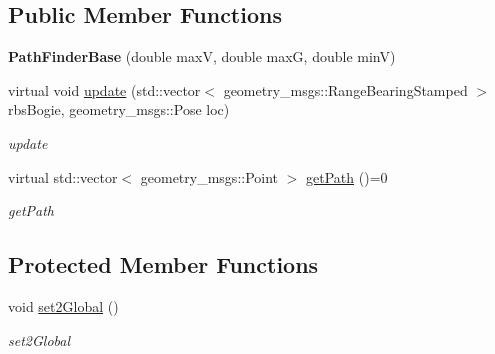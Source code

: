 \subsection*{Public Member Functions}
\begin{DoxyCompactItemize}
\item 
\mbox{\label{classPathFinderBase_ae30b59d707c325d7103df2ae4e4216ef}} 
{\bfseries Path\+Finder\+Base} (double maxV, double maxG, double minV)
\item 
virtual void \hyperlink{classPathFinderBase_a7ab8a19a0247b66e5636e29194e5fadd}{update} (std\+::vector$<$ geometry\+\_\+msgs\+::\+Range\+Bearing\+Stamped $>$ rbs\+Bogie, geometry\+\_\+msgs\+::\+Pose loc)
\begin{DoxyCompactList}\small\item\em update \end{DoxyCompactList}\item 
virtual std\+::vector$<$ geometry\+\_\+msgs\+::\+Point $>$ \hyperlink{classPathFinderBase_aa254c2b8392f028898f691920341caa0}{get\+Path} ()=0
\begin{DoxyCompactList}\small\item\em get\+Path \end{DoxyCompactList}\end{DoxyCompactItemize}
\subsection*{Protected Member Functions}
\begin{DoxyCompactItemize}
\item 
void \hyperlink{classPathFinderBase_a2091af56120dbf598b826e10f0d54fac}{set2\+Global} ()
\begin{DoxyCompactList}\small\item\em set2\+Global \end{DoxyCompactList}\end{DoxyCompactItemize}
